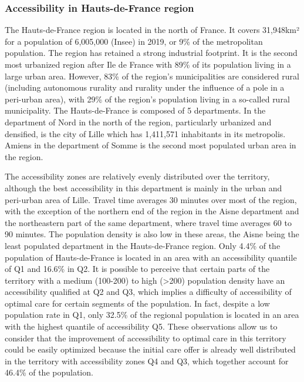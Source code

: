 \subsubsection{Accessibility in Hauts-de-France region}

The Hauts-de-France region is located in the north of France. It covers
31,948km² for a population of 6,005,000 (Insee) in 2019, or 9\% of the
metropolitan population. The region has retained a strong industrial footprint.
It is the second most urbanized region after Ile de France with 89\% of its
population living in a large urban area. However, 83\% of the region's
municipalities are considered rural (including autonomous rurality and rurality
under the influence of a pole in a peri-urban area), with 29\% of the region's
population living in a so-called rural municipality. The Hauts-de-France is
composed of 5 departments. In the department of Nord in the north of the region,
particularly urbanized and densified, is the city of Lille which has 1,411,571
inhabitants in its metropolis. Amiens in the department of Somme is the second
most populated urban area in the region.

The accessibility zones are relatively evenly distributed over the territory,
although the best accessibility in this department is mainly in the urban and
peri-urban area of Lille. Travel time averages 30 minutes over most of the
region, with the exception of the northern end of the region in the Aisne
department and the northeastern part of the same department, where travel time
averages 60 to 90 minutes. The population density is also low in these areas,
the Aisne being the least populated department in the Hauts-de-France region.
Only 4.4\% of the population of Hauts-de-France is located in an area with an
accessibility quantile of Q1 and 16.6\% in Q2. It is possible to perceive that
certain parts of the territory with a medium (100-200) to high (>200) population
density have an accessibility qualified at Q2 and Q3, which implies a difficulty
of accessibility of optimal care for certain segments of the population. In
fact, despite a low population rate in Q1, only 32.5\% of the regional
population is located in an area with the highest quantile of accessibility Q5.
These observations allow us to consider that the improvement of accessibility to
optimal care in this territory could be easily optimized because the initial
care offer is already well distributed in the territory with accessibility zones
Q4 and Q3, which together account for 46.4\% of the population.

